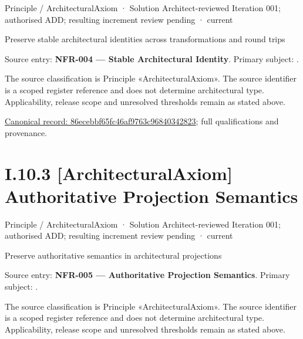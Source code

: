 \label{element:86ecebbf65fc46af9763c96840342823}
{\small Principle / ArchitecturalAxiom · Solution Architect-reviewed Iteration 001; authorised ADD; resulting increment review pending · current}\par

Preserve stable architectural identities across transformations and round trips



Source entry: \textbf{NFR-004 — Stable Architectural Identity}. Primary subject: \texttt{}.



The source classification is Principle «ArchitecturalAxiom». The source identifier is a scoped register reference and does not determine architectural type. Applicability, release scope and unresolved thresholds remain as stated above.


{\footnotesize \href{../../../../../../../continuum/motivation/principle/architectural-axiom/86ecebbf65fc46af9763c96840342823.md}{Canonical record: 86ecebbf65fc46af9763c96840342823}; full qualifications and provenance.}\par
\section*{I.10.3 [ArchitecturalAxiom] Authoritative Projection Semantics}
\label{navigation:I.10.3}

\label{element:d8ae43c850a646d485e6aba6c41a88e2}
{\small Principle / ArchitecturalAxiom · Solution Architect-reviewed Iteration 001; authorised ADD; resulting increment review pending · current}\par

Preserve authoritative semantics in architectural projections



Source entry: \textbf{NFR-005 — Authoritative Projection Semantics}. Primary subject: \texttt{}.



The source classification is Principle «ArchitecturalAxiom». The source identifier is a scoped register reference and does not determine architectural type. Applicability, release scope and unresolved thresholds remain as stated above.


